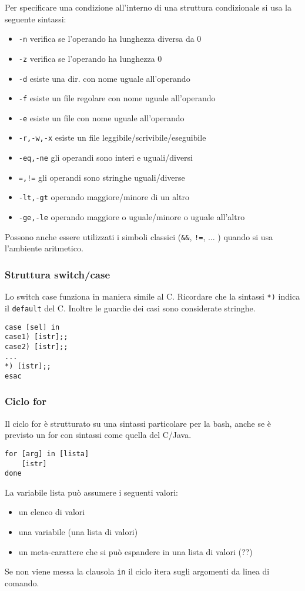 \documentclass[a4paper, 10pt]{article}
\begin{document}
Per specificare una condizione all'interno di una struttura condizionale si usa la seguente sintassi:
\begin{itemize}
\item \verb|-n| verifica se l'operando ha lunghezza diversa da 0
\item \verb|-z| verifica se l'operando ha lunghezza 0
\item \verb|-d| esiste una dir. con nome uguale all'operando
\item \verb|-f| esiste un file regolare con nome uguale all'operando
\item \verb|-e| esiste un file con nome uguale all'operando
\item \verb|-r,-w,-x| esiste un file leggibile/scrivibile/eseguibile
\item \verb|-eq,-ne| gli operandi sono interi e uguali/diversi
\item \verb|=,!=| gli operandi sono stringhe uguali/diverse
\item \verb|-lt,-gt| operando maggiore/minore di un altro
\item \verb|-ge,-le| operando maggiore o uguale/minore o uguale all'altro
\end{itemize}

Possono anche essere utilizzati i simboli classici (\verb|&&|, \verb|!=|, ... ) quando si usa l'ambiente aritmetico.

\subsubsection{Struttura switch/case}
Lo switch case funziona in maniera simile al C. Ricordare che la sintassi \verb|*)| indica il \verb|default| del C. Inoltre le guardie dei casi sono considerate stringhe.
\begin{verbatim}
case [sel] in
case1) [istr];;
case2) [istr];;
...
*) [istr];;
esac
\end{verbatim}

\subsubsection{Ciclo for}
Il ciclo for è strutturato su una sintassi particolare per la bash, anche se è previsto un for con sintassi come quella del C/Java.
\begin{verbatim}
for [arg] in [lista]
    [istr]
done
\end{verbatim}
La variabile lista può assumere i seguenti valori:
\begin{itemize}
\item un elenco di valori
\item una variabile (una lista di valori)
\item un meta-carattere che si può espandere in una lista di valori (??)
\end{itemize}
Se non viene messa la clausola \verb|in| il ciclo itera sugli argomenti da linea di comando.
\end{document}
